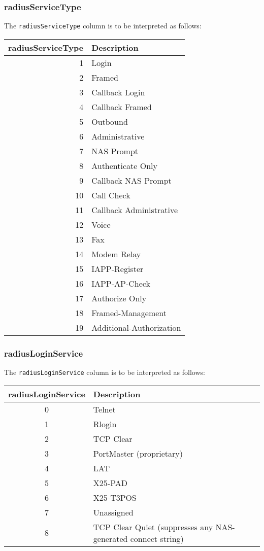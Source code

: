 \documentclass[documentation]{subfiles}
\begin{document}
\subsubsection{radiusServiceType}\label{radiusServiceType}
The {\tt radiusServiceType} column is to be interpreted as follows:
\begin{longtable}{rl}
    \toprule
    {\bf radiusServiceType} & {\bf Description}\\
    \midrule\endhead%
     1 & Login\\
     2 & Framed\\
     3 & Callback Login\\
     4 & Callback Framed\\
     5 & Outbound\\
     6 & Administrative\\
     7 & NAS Prompt\\
     8 & Authenticate Only\\
     9 & Callback NAS Prompt\\
    10 & Call Check\\
    11 & Callback Administrative\\
    12 & Voice\\
    13 & Fax\\
    14 & Modem Relay\\
    15 & IAPP-Register\\
    16 & IAPP-AP-Check\\
    17 & Authorize Only\\
    18 & Framed-Management\\
    19 & Additional-Authorization\\
    \bottomrule
\end{longtable}

\subsubsection{radiusLoginService}\label{radiusLoginService}
The {\tt radiusLoginService} column is to be interpreted as follows:
\begin{longtable}{cl}
    \toprule
    {\bf radiusLoginService} & {\bf Description}\\
    \midrule\endhead%
    0 & Telnet\\
    1 & Rlogin\\
    2 & TCP Clear\\
    3 & PortMaster (proprietary)\\
    4 & LAT\\
    5 & X25-PAD\\
    6 & X25-T3POS\\
    7 & Unassigned\\
    8 & TCP Clear Quiet (suppresses any NAS-generated connect string)\\
    \bottomrule
\end{longtable}
\end{document}
